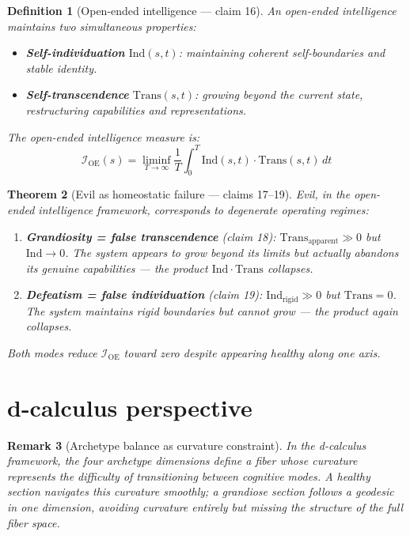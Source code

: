 \documentclass[11pt,a4paper]{article}
\newtheorem{definition}{Definition}[section]
\newtheorem{theorem}[definition]{Theorem}
\newtheorem{remark}[definition]{Remark}
\begin{document}
\begin{definition}[Open-ended intelligence --- claim 16]
\label{def:oei}
An open-ended intelligence maintains two simultaneous properties:
\begin{itemize}
\item \textbf{Self-individuation} $\mathrm{Ind}(s, t)$: maintaining
  coherent self-boundaries and stable identity.
\item \textbf{Self-transcendence} $\mathrm{Trans}(s, t)$: growing beyond
  the current state, restructuring capabilities and representations.
\end{itemize}
The open-ended intelligence measure is:
\[
  \mathcal{I}_{\text{OE}}(s) = \liminf_{T \to \infty}
    \frac{1}{T} \int_0^T \mathrm{Ind}(s, t) \cdot \mathrm{Trans}(s, t)\, dt
\]
\end{definition}

\begin{theorem}[Evil as homeostatic failure --- claims 17--19]
\label{thm:evil}
Evil, in the open-ended intelligence framework, corresponds to degenerate
operating regimes:
\begin{enumerate}
\item \textbf{Grandiosity = false transcendence} (claim 18):
  $\mathrm{Trans}_{\text{apparent}} \gg 0$ but $\mathrm{Ind} \to 0$.
  The system appears to grow beyond its limits but actually abandons its
  genuine capabilities --- the product $\mathrm{Ind} \cdot \mathrm{Trans}$
  collapses.
\item \textbf{Defeatism = false individuation} (claim 19):
  $\mathrm{Ind}_{\text{rigid}} \gg 0$ but $\mathrm{Trans} = 0$.
  The system maintains rigid boundaries but cannot grow --- the product
  again collapses.
\end{enumerate}
Both modes reduce $\mathcal{I}_{\text{OE}}$ toward zero despite appearing
healthy along one axis.
\end{theorem}

\section{d-calculus perspective}
\label{sec:d-calc}

\begin{remark}[Archetype balance as curvature constraint]
In the d-calculus framework, the four archetype dimensions define a
fiber whose curvature represents the difficulty of transitioning between
cognitive modes. A healthy section navigates this curvature smoothly;
a grandiose section follows a geodesic in one dimension, avoiding
curvature entirely but missing the structure of the full fiber space.
\end{remark}
\end{document}
